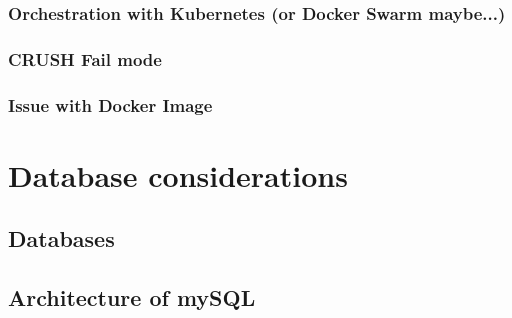 \documentclass[titlepage, a4paper, 11pt]{scrartcl}
\begin{document}

            \subsubsection{Orchestration with Kubernetes (or Docker Swarm maybe...)}


            \subsubsection{CRUSH Fail mode}\label{system:crush-fail}




            \subsubsection{Issue with Docker Image}



        
    \section{Database considerations}

        \subsection{Databases}


        \subsection{Architecture of mySQL}
\end{document}
